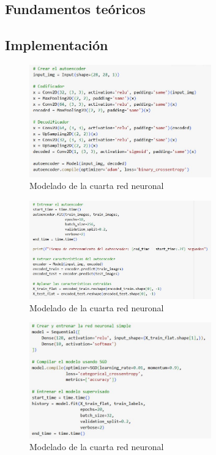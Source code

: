 \subsection{Fundamentos teóricos}

\subsection{Implementación}

\begin{figure}[H]
	\centering
	\includegraphics[width=0.7\textwidth]{imgs/model-1-red4.JPG}
	\caption{Modelado de la cuarta red neuronal}
	\label{fig:model-1-red4}
\end{figure}

\begin{figure}[H]
	\centering
	\includegraphics[width=0.7\textwidth]{imgs/model-2-red4.JPG}
	\caption{Modelado de la cuarta red neuronal}
	\label{fig:model-2-red4}
\end{figure}

\begin{figure}[H]
	\centering
	\includegraphics[width=0.7\textwidth]{imgs/model-3-red4.JPG}
	\caption{Modelado de la cuarta red neuronal}
	\label{fig:model-3-red4}
\end{figure}


